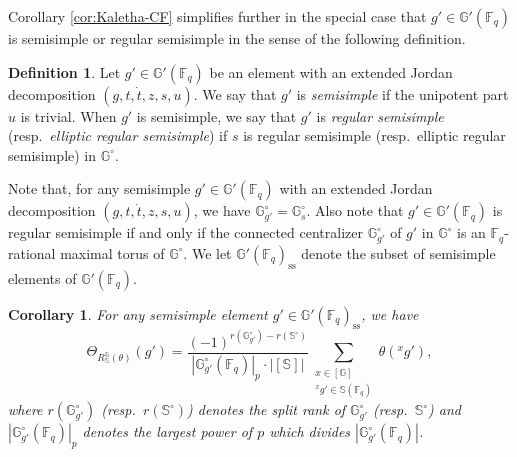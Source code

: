 \documentclass{amsart}
\renewcommand{\ss}{\mathrm{ss}}
\newcommand{\F}{\mathbb{F}}
\newcommand{\FF}{\mathbb{F}}
\newcommand{\bbS}{\mathbb{S}}
\newcommand{\bbG}{\mathbb{G}}
\theoremstyle{plain}
\newtheorem{cor}[thm]{Corollary}
\theoremstyle{definition}
\newtheorem{definition}[thm]{Definition}
\theoremstyle{remark}
\theoremstyle{theorem}
\begin{document}
Corollary \ref{cor:Kaletha-CF} simplifies further in the special case that $g' \in \bbG'(\FF_q)$ is semisimple or regular semisimple in the sense of the following definition.

\begin{definition}\label{def:G' semisimple}
Let $g' \in \bbG'(\FF_q)$ be an element with an extended Jordan decomposition $(g,t,\dot{t},z,s,u)$.
We say that $g'$ is \textit{semisimple} if the unipotent part $u$ is trivial.
When $g'$ is semisimple, we say that $g'$ is \textit{regular semisimple} (resp.\ \textit{elliptic regular semisimple}) if $s$ is regular semisimple (resp.\ elliptic regular semisimple) in $\bbG^{\circ}$.
\end{definition}

Note that, for any semisimple $g'\in\bbG'(\F_q)$ with an extended Jordan decomposition $(g,t,\dot{t},z,s,u)$, we have $\bbG_{g'}^{\circ}=\bbG_{s}^{\circ}$.
Also note that $g' \in \bbG'(\FF_q)$ is regular semisimple if and only if the connected centralizer $\bbG_{g'}^\circ$ of $g'$ in $\bbG^\circ$ is an $\FF_q$-rational maximal torus of $\bbG^\circ$.
We let $\bbG'(\FF_q)_{\ss}$ denote the subset of semisimple elements of $\bbG'(\F_{q})$.

\begin{cor}\label{cor:Kaletha-CF-ss}
For any semisimple element $g' \in \bbG'(\FF_q)_{\ss}$, we have
    \begin{equation*}
        \Theta_{R_{\bbS}^{\bbG}(\theta)}(g') = \frac{(-1)^{r(\bbG_{g'}^\circ) - r(\bbS^{\circ})}}{|\bbG_{g'}^\circ(\FF_q)|_p \cdot |[\bbS]|} \sum_{\substack{x \in [\bbG] \\ {}^x g' \in \bbS(\FF_q)}} \theta({}^x g'),
    \end{equation*}
    where $r(\bbG^{\circ}_{g'})$ (resp.\ $r(\bbS^{\circ})$) denotes the split rank of $\bbG^{\circ}_{g'}$ (resp.\ $\bbS^{\circ}$) and $|\bbG_{g'}^\circ(\FF_q)|_p$ denotes the largest power of $p$ which divides $|\bbG_{g'}^\circ(\FF_q)|$.
\end{cor}
\end{document}
